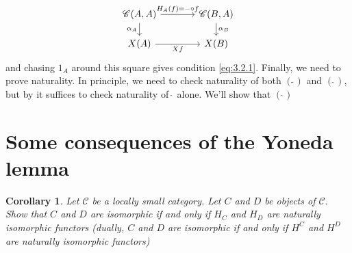 \documentclass[10pt,oneside]{book}
\def\~#1{\mathscr{#1}}
\theoremstyle{plain}
\newtheorem{cor}[thm]{Corollary}
\theoremstyle{definition}
\theoremstyle{remark}
\numberwithin{equation}{section}
\numberwithin{figure}{section}
\begin{document}
\[\begin{tikzcd}[sep=scriptsize]
    {\~C(A,A)} && {\~C(B,A)} \\
    {X(A)} && {X(B)}
    \arrow["{H_A(f) =-\circ f}", from=1-1, to=1-3]
    \arrow["{\alpha_A}"', from=1-1, to=2-1]
    \arrow["{\alpha_B}", from=1-3, to=2-3]
    \arrow["Xf"', from=2-1, to=2-3]
\end{tikzcd}\]
and chasing $1_A$ around this square gives condition \ref{eq:3.2.1}. Finally, we need to prove naturality. In principle, we need to check naturality of both $(\tilde{~})$ and $(\hat{~})$, but by \label{lem:nat_isom_condition} it suffices to check naturality of $\hat{~}$ alone. We'll show that $(\hat{~})$  


\section{Some consequences of the Yoneda lemma}
\begin{cor}
Let $\~C$ be a locally small category. Let $C$ and $D$ be objects of $\~C$. Show that $C$ and $D$ are isomorphic if and only if $H_C$ and $H_D$ are naturally isomorphic functors (dually, $C$ and $D$ are isomorphic if and only if $H^C$ and $H^D$ are naturally isomorphic functors)
\end{cor}
\end{document}
